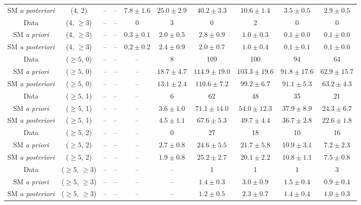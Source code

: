 \begin{table}[h!]
{\begin{tabular}{cccccccccc}
	SM \textit{a posteriori} & (4, 2) & -- & -- & $7.8\pm 1.6$ & $25.0\pm 2.9$ & $40.2\pm 3.3$ & $10.6\pm 1.4$ & $3.5\pm 0.5$ & $2.9\pm 0.5$ \\[0.5ex] 
	Data & (4, $\ge3$) & -- & -- & 0 & 3 & 0 & 2 & 0 & 0 \\[0.5ex] 
	SM \textit{a priori} & (4, $\ge3$) & -- & -- & $0.3\pm 0.1$ & $2.0\pm 0.5$ & $2.8\pm 0.9$ & $1.0\pm 0.3$ & $0.1\pm 0.0$ & $0.1\pm 0.0$ \\[0.5ex] 
	SM \textit{a posteriori} & (4, $\ge3$) & -- & -- & $0.2\pm 0.2$ & $2.4\pm 0.9$ & $2.0\pm 0.7$ & $1.0\pm 0.4$ & $0.1\pm 0.1$ & $0.1\pm 0.0$ \\[0.5ex] 
	Data & ($\ge5$, 0) & -- & -- & -- & 8 & 109 & 100 & 94 & 64 \\[0.5ex] 
	SM \textit{a priori} & ($\ge5$, 0) & -- & -- & -- & $18.7\pm 4.7$ & $114.9\pm 19.0$ & $103.3\pm 19.6$ & $91.8\pm 17.6$ & $62.9\pm 15.7$ \\[0.5ex] 
	SM \textit{a posteriori} & ($\ge5$, 0) & -- & -- & -- & $13.1\pm 2.4$ & $110.6\pm 7.2$ & $99.2\pm 6.7$ & $91.1\pm 5.3$ & $63.2\pm 4.3$ \\[0.5ex] 
	Data & ($\ge5$, 1) & -- & -- & -- & 6 & 62 & 48 & 35 & 21 \\[0.5ex] 
	SM \textit{a priori} & ($\ge5$, 1) & -- & -- & -- & $3.6\pm 1.0$ & $71.1\pm 14.0$ & $54.0\pm 12.3$ & $37.9\pm 8.9$ & $24.3\pm 6.7$ \\[0.5ex] 
	SM \textit{a posteriori} & ($\ge5$, 1) & -- & -- & -- & $4.5\pm 1.1$ & $67.6\pm 5.3$ & $49.7\pm 4.4$ & $36.7\pm 2.8$ & $22.6\pm 1.8$ \\[0.5ex] 
	Data & ($\ge5$, 2) & -- & -- & -- & 0 & 27 & 18 & 10 & 16 \\[0.5ex] 
	SM \textit{a priori} & ($\ge5$, 2) & -- & -- & -- & $2.7\pm 0.8$ & $24.6\pm 5.5$ & $21.7\pm 5.8$ & $10.9\pm 3.1$ & $7.2\pm 2.3$ \\[0.5ex] 
	SM \textit{a posteriori} & ($\ge5$, 2) & -- & -- & -- & $1.9\pm 0.8$ & $25.2\pm 2.7$ & $20.1\pm 2.2$ & $10.8\pm 1.1$ & $7.5\pm 0.8$ \\[0.5ex] 
	Data & ($\ge5$, $\ge3$) & -- & -- & -- & -- & 1 & 1 & 1 & 3 \\[0.5ex] 
	SM \textit{a priori} & ($\ge5$, $\ge3$) & -- & -- & -- & -- & $1.4\pm 0.3$ & $3.0\pm 0.9$ & $1.5\pm 0.4$ & $0.9\pm 0.4$ \\[0.5ex] 
	SM \textit{a posteriori} & ($\ge5$, $\ge3$) & -- & -- & -- & -- & $1.2\pm 0.5$ & $2.3\pm 0.7$ & $1.4\pm 0.4$ & $1.0\pm 0.3$ \\[0.5ex] 
	\hline
	\hline
\end{tabular}}
\end{table}

